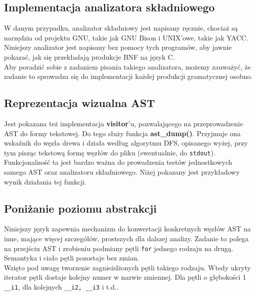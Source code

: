 		\subsection{Implementacja analizatora składniowego}
			
			W danym przypadku, analizator składniowy jest napisany ręcznie, chociaż są narzędzia od
			projektu GNU, takie jak GNU Bison i UNIX'owe, takie jak YACC. Niniejszy analizator
		  	jest napisany bez pomocy tych programów, aby jawnie pokazać, jak się przekładają
		  	produkcje BNF na język C.
		  	\\
		  	
		  	Aby poradzić sobie z zadaniem pisania takiego analizatora, możemy zauważyć, że
		  	zadanie to sprowadza się do implementacji każdej produkcji gramatycznej osobno.
	  	
	  	\subsection{Reprezentacja wizualna AST}
	  		
	  		Jest pokazana też implementacja \textbf{visitor}'u, pozwalającego na przeprowadzenie AST
			do formy tekstowej. Do tego służy funkcja \textbf{ast_dump()}. Przyjmuje ona wskaźnik do
			węzła drewa i działa według algorytmu DFS, opisanego wyżej, przy tym pisząc tekstową formę
			węzłów do pliku (ewentualnie, do \texttt{stdout}). Funkcjonalność ta jest bardzo ważna do
			prowadzenia testów jednostkowych samego AST oraz analizatoru składniowego.
			Niżej pokazany jest przykładowy wynik działania tej funkcji.
			\\
	
			

		\subsection{Poniżanie poziomu abstrakcji}
			
			Niniejszy język zapewnia mechanizm do konwertacji konkretnych
			węzłów AST na inne, mające więcej szczegółów, prostszych dla
			dalszej analizy. Zadanie to polega na przejściu AST i zrobieniu
			podmiany pętli \texttt{for} jednego rodzaju na drugą. Semantyka i
			ciało pętli pozostaje bez zmian.
			\\

			Wzięto pod uwagę tworzenie zagnieżdżonych pętli
			takiego rodzaju. Wtedy ukryty iterator pętli dostaje kolejny numer
			w nazwie zmiennej. Dla pętli o głębokości 1 \texttt{__i1}, dla kolejnych
			\texttt{__i2, __i3} i t.d..
			\\
			
